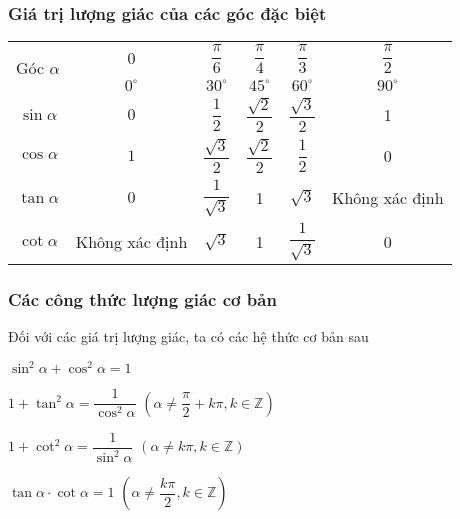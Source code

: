 \begin{tomtat}
	\subsubsection{Giá trị lượng giác của các góc đặc biệt}
	\begin{center}
		\renewcommand{\arraystretch}{2}
		\begin{tabular}{|c|c|c|c|c|c|}
			\hline
			\multirow{2}{*}{Góc $\alpha$} & $0$              & $\dfrac{\pi}{6}$  & $\dfrac{\pi}{4}$  & $\dfrac{\pi}{3}$  & $\dfrac{\pi}{2}$              \\ \cline{2-6} 
			& $0^\circ$              & $30^\circ$  & $45^\circ$  & $60^\circ$  & $90^\circ$             \\ \hline
			$\sin\alpha$                  & $0$             & $\dfrac{1}{2}$ & $\dfrac{\sqrt{2}}{2}$ & $\dfrac{\sqrt{3}}{2}$ & 1              \\ \hline
			$\cos\alpha$                  & $1$             & $\dfrac{\sqrt{3}}{2}$ & $\dfrac{\sqrt{2}}{2}$ & $\dfrac{1}{2}$ & 0              \\ \hline
			$\tan\alpha$                 & $0$             & $\dfrac{1}{\sqrt{3}}$ & 1 & $\sqrt{3}$ & Không xác định \\ \hline
			$\cot\alpha$                  & Không xác định & $\sqrt{3}$ & 1 & $\dfrac{1}{\sqrt{3}}$ & 0              \\ \hline
		\end{tabular}
	\end{center}
	\subsubsection{Các công thức lượng giác cơ bản}
	Đối với các giá trị lượng giác, ta có các hệ thức cơ bản sau
	\begin{enumEX}[$\bullet$]{2}
		\item $\sin^2 \alpha  + \cos^2 \alpha =1$
		\item $ 1+ \tan^2 \alpha= \dfrac{1}{\cos^2 \alpha}$ $\left(\alpha \neq \dfrac{\pi}{2}+k\pi , k\in \mathbb{Z}\right)$
		\item $ 1+ \cot^2 \alpha= \dfrac{1}{\sin^2 \alpha}$ $\left(\alpha \neq k\pi , k\in \mathbb{Z}\right)$
		\item $\tan \alpha \cdot \cot \alpha =1 $ $\left(\alpha \neq \dfrac{k\pi}{2}, k\in \mathbb{Z}\right)$
	\end{enumEX}
	

\end{tomtat}
